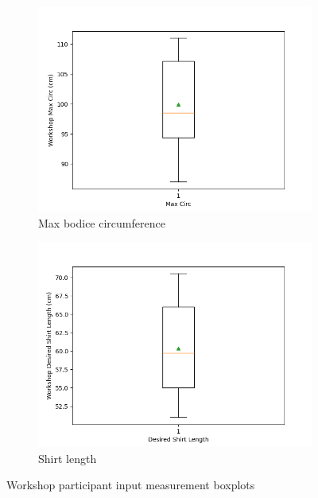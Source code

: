 \begin{figure}[H]
    \centering
    \begin{subfigure}[b]{0.45\textwidth}
        \centering
        \includegraphics[width=\textwidth]{Images/Workshop_max_circ_Boxplot.png}
        \caption{Max bodice circumference}
        \label{fig:workshop_max_circ}
    \end{subfigure}
    \hfill
    \begin{subfigure}[b]{0.45\textwidth}
        \centering
        \includegraphics[width=\textwidth]{Images/Workshop_desired_shirt_length_Boxplot.png}
        \caption{Shirt length}
        \label{fig:workshop_shirt_length}
    \end{subfigure}
    \caption{Workshop participant input measurement boxplots}
\end{figure}

